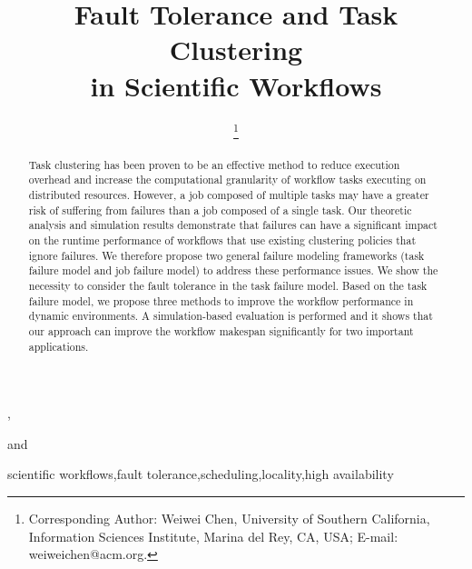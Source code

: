 \documentclass{IOS-Book-Article}
\begin{document}
\begin{frontmatter}              %

\title{Fault Tolerance and Task Clustering\\
 in Scientific Workflows}

\author[A]{ %
\thanks{Corresponding Author: Weiwei Chen, University of Southern California, Information Sciences Institute, Marina del Rey, CA, USA; E-mail:
weiweichen@acm.org.}},
\author[B]{ }
and
\author[B]{ }

\address[A]{University of Southern California, Information Sciences Institute, Marina del Rey, CA, USA}
\address[B]{University of Manchester, School of Computer Science, Manchester, U.K}

\begin{abstract}
Task clustering has been proven to be an effective method to reduce execution overhead and increase the computational granularity of workflow tasks executing on distributed resources. However, a job composed of multiple tasks may have a greater risk of suffering from failures than a job composed of a single task. Our theoretic analysis and simulation results demonstrate that failures can have a significant impact on the runtime performance of workflows that use existing clustering policies that ignore failures. We therefore propose two general failure modeling frameworks (task failure model and job failure model) to address these performance issues. We show the necessity to consider the fault tolerance in the task failure model. Based on the task failure model, we propose three methods to improve the workflow performance in dynamic environments. A simulation-based evaluation is performed and it shows that our approach can improve the workflow makespan significantly for two important applications.    
\end{abstract}

\begin{keyword}
scientific workflows\sep fault tolerance\sep scheduling\sep locality\sep high availability 
\end{keyword}
\end{frontmatter}

\thispagestyle{empty}
\pagestyle{empty}
\end{document}
